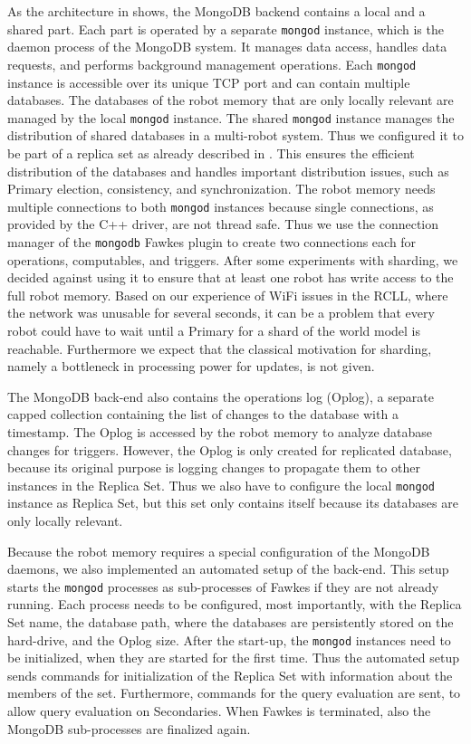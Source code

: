 As the architecture in  shows, the MongoDB backend
contains a local and a shared part. Each part is operated by a
separate \texttt{mongod} instance, which is the daemon process of the
MongoDB system. It manages data access, handles data requests, and
performs background management operations. Each \texttt{mongod}
instance is accessible over its unique TCP port and can contain multiple
databases. The databases of the robot memory that are only locally
relevant are managed by the local \texttt{mongod} instance. The shared
\texttt{mongod} instance manages the distribution of shared databases
in a multi-robot system. Thus we configured it to be part of a replica
set as already described in . This ensures the
efficient distribution of the databases and handles important
distribution issues, such as Primary election, consistency, and
synchronization. The
robot memory needs multiple connections to both \texttt{mongod}
instances because single connections, as provided by the C++ driver,
are not thread safe. Thus we use the connection manager of the
\texttt{mongodb} Fawkes plugin to create two connections each for
operations, computables, and triggers. After some experiments with sharding, we decided
against using it to ensure that at least one robot has write access to
the full robot memory. Based on our experience of WiFi issues in the RCLL,
where the network was unusable for several seconds, it can be a
problem that every robot could have to wait until a Primary for a shard of
the world model is reachable.
Furthermore we expect that the classical motivation for sharding,
namely a bottleneck in processing power for updates, is not given.

The MongoDB back-end also contains the operations log (Oplog), a
separate capped collection containing the list of changes to the
database with a timestamp. The Oplog is accessed by the robot memory
to analyze database changes for triggers. However, the Oplog is only
created for replicated database, because its original purpose is
logging changes to propagate them to other instances in the Replica
Set. Thus we also have to configure the local \texttt{mongod} instance
as Replica Set, but this set only contains itself because its
databases are only locally relevant.

Because the robot memory requires a special configuration of the
MongoDB daemons, we also implemented an automated setup of the
back-end. This setup starts the \texttt{mongod} processes as
sub-processes of Fawkes if they are not already running. Each process
needs to be configured, most importantly, with the Replica Set name,
the database path, where the databases are persistently stored on the
hard-drive, and the Oplog size. After the start-up, the \texttt{mongod}
instances need to be initialized, when they are started for the first
time. Thus the automated setup sends commands for initialization of
the Replica Set with information about the members of the
set. Furthermore, commands for the query evaluation are sent, to allow
query evaluation on Secondaries. When Fawkes is terminated, also the
MongoDB sub-processes are finalized again.


